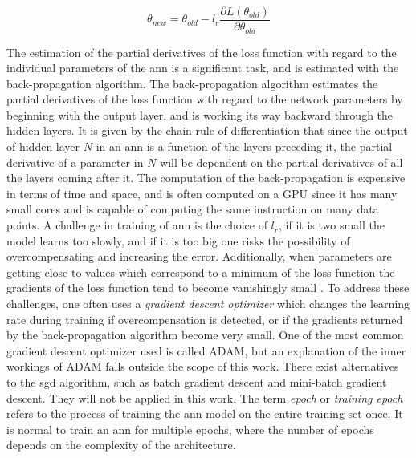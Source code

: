 \begin{equation}
    \theta_{new} = \theta_{old} - l_r \frac{\partial L(\theta_{old})}{\partial \theta_{old}}
    \label{eq:sgd}
\end{equation}

The estimation of the partial derivatives of the loss function with regard to the individual parameters of the \acrshort{ann} is a significant task, and is estimated with the back-propagation algorithm. The back-propagation algorithm estimates the partial derivatives of the loss function with regard to the network parameters by beginning with the output layer, and is working its way backward through the hidden layers. It is given by the chain-rule of differentiation that since the output of hidden layer $N$ in an \acrshort{ann} is a function of the layers preceding it, the partial derivative of a parameter in $N$ will be dependent on the partial derivatives of all the layers coming after it. The computation of the back-propagation is expensive in terms of time and space, and is often computed on a GPU since it has many small cores and is capable of computing the same instruction on many data points. A challenge in training of \acrshort{ann} is the choice of $l_r$, if it is two small the model learns too slowly, and if it is too big one risks the possibility of overcompensating and increasing the error. Additionally, when parameters are getting close to values which correspond to a minimum of the loss function the gradients of the loss function tend to become vanishingly small \cite{dl_book}. To address these challenges, one often uses a \textit{gradient descent optimizer} which changes the learning rate during training if overcompensation is detected, or if the gradients returned by the back-propagation algorithm become very small. One of the most common gradient descent optimizer used is called ADAM, but an explanation of the inner workings of ADAM falls outside the scope of this work. There exist alternatives to the \acrshort{sgd} algorithm, such as batch gradient descent and mini-batch gradient descent. They will not be applied in this work. The term \textit{epoch} or \textit{training epoch} refers to the process of training the \acrshort{ann} model on the entire training set once. It is normal to train an \acrshort{ann} for multiple epochs, where the number of epochs depends on the complexity of the architecture.  

